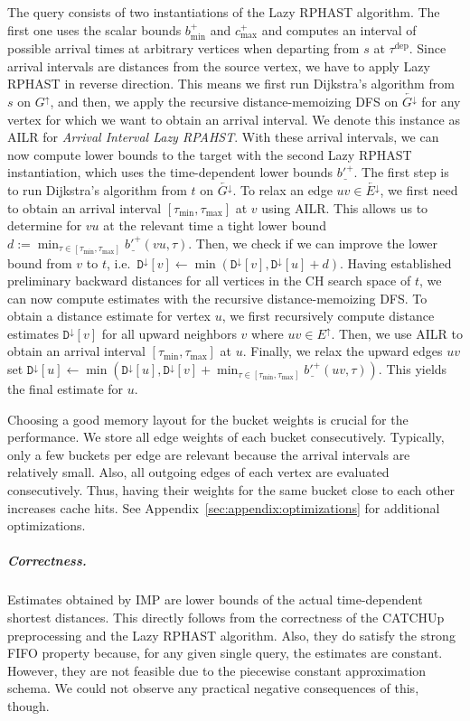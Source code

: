 \documentclass[a4paper,UKenglish,cleveref, autoref, thm-restate,anonymous]{lipics-v2021}
\newcommand*{\comb}{c}
\newcommand*{\tdep}{\tau^{\operatorname{dep}}}
\newcommand*{\gchu}{G^{\uparrow}}
\newcommand*{\gchd}{\overleftarrow{G^{\downarrow}}}
\newcommand*{\echu}{E^{\uparrow}}
\newcommand*{\rechd}{\overleftarrow{E^{\downarrow}}}
\newcommand*{\pcfn}{\underline{b'^+}}
\begin{document}
The query consists of two instantiations of the Lazy RPHAST algorithm.
The first one uses the scalar bounds $b^+_{\min}$ and $\comb^+_{\max}$ and computes an interval of possible arrival times at arbitrary vertices when departing from $s$ at $\tdep$.
Since arrival intervals are distances from the source vertex, we have to apply Lazy RPHAST in reverse direction.
This means we first run Dijkstra's algorithm from $s$ on $\gchu$, and then, we apply the recursive distance-memoizing DFS on $\gchd$ for any vertex for which we want to obtain an arrival interval.
We denote this instance as AILR for \emph{Arrival Interval Lazy RPAHST}.
With these arrival intervals, we can now compute lower bounds to the target with the second Lazy RPHAST instantiation, which uses the time-dependent lower bounds $\pcfn$.
The first step is to run Dijkstra's algorithm from $t$ on $\gchd$.
To relax an edge $uv \in \rechd$, we first need to obtain an arrival interval $[\tau_{\min}, \tau_{\max}]$ at $v$ using AILR.
This allows us to determine for $vu$ at the relevant time a tight lower bound $d := \min_{\tau \in [\tau_{\min}, \tau_{\max}]} \pcfn(vu, \tau)$.
Then, we check if we can improve the lower bound from $v$ to $t$, i.e.\ $\mathtt{D}^{\downarrow}[v] \leftarrow \min(\mathtt{D}^{\downarrow}[v], \mathtt{D}^{\downarrow}[u] + d)$.
Having established preliminary backward distances for all vertices in the CH search space of $t$, we can now compute estimates with the recursive distance-memoizing DFS.
To obtain a distance estimate for vertex $u$, we first recursively compute distance estimates $\mathtt{D}^{\downarrow}[v]$ for all upward neighbors $v$ where $uv \in \echu$.
Then, we use AILR to obtain an arrival interval $[\tau_{\min}, \tau_{\max}]$ at $u$.
Finally, we relax the upward edges $uv$ set $\mathtt{D}^{\downarrow}[u] \leftarrow \min(\mathtt{D}^{\downarrow}[u], \mathtt{D}^{\downarrow}[v] + \min_{\tau \in [\tau_{\min}, \tau_{\max}]} \pcfn(uv, \tau))$.
This yields the final estimate for $u$.

Choosing a good memory layout for the bucket weights is crucial for the performance.
We store all edge weights of each bucket consecutively.
Typically, only a few buckets per edge are relevant because the arrival intervals are relatively small.
Also, all outgoing edges of each vertex are evaluated consecutively.
Thus, having their weights for the same bucket close to each other increases cache hits.
See Appendix~\ref{sec:appendix:optimizations} for additional optimizations.

\subparagraph{Correctness.}
Estimates obtained by IMP are lower bounds of the actual time-dependent shortest distances.
This directly follows from the correctness of the CATCHUp preprocessing and the Lazy RPHAST algorithm.
Also, they do satisfy the strong FIFO property because, for any given single query, the estimates are constant.
However, they are not feasible due to the piecewise constant approximation schema.
We could not observe any practical negative consequences of this, though.
\end{document}
